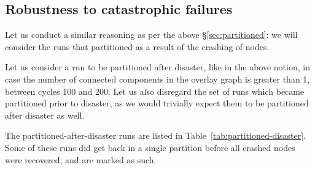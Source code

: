 \documentclass[a4paper]{ifacconf}
\begin{document}
\subsection{Robustness to catastrophic failures}

Let us conduct a similar reasoning as per the above \S\ref{sec:partitioned}: we will consider the runs that partitioned as a result of the crashing of nodes.

Let us consider a run to be partitioned after disaster, like in the above notion, in case the number of connected components in the overlay graph is greater than 1, between cycles 100 and 200.
Let us also disregard the set of runs which became partitioned prior to disaster, as we would trivially expect them to be partitioned after disaster as well.

The partitioned-after-disaster runs are listed in Table~\ref{tab:partitioned-disaster}.
Some of these runs did get back in a single partition before all crashed nodes were recovered, and are marked as such.
\end{document}

